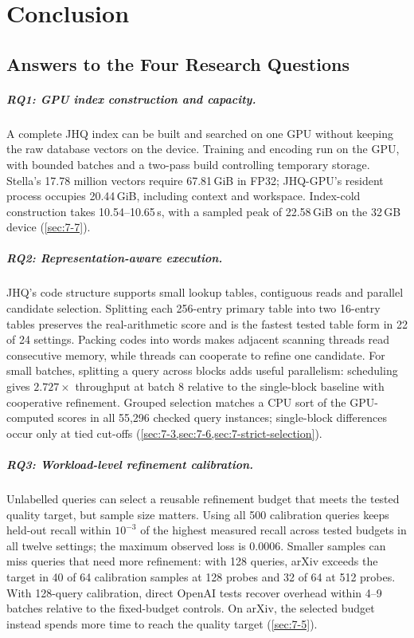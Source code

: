 \chapter{Conclusion}
\label{ch:conclusion}

\section{Answers to the Four Research Questions}
\label{sec:9-1}

\paragraph{RQ1: GPU index construction and capacity.}
A complete JHQ index can be built and searched on one GPU without keeping
the raw database vectors on the device. Training and encoding run on the
GPU, with bounded batches and a two-pass build controlling temporary
storage. Stella's 17.78 million vectors require 67.81\,GiB in FP32;
JHQ-GPU's resident process occupies 20.44\,GiB, including context and
workspace. Index-cold construction takes 10.54--10.65\,s, with a sampled peak of
22.58\,GiB on the 32\,GB device (\cref{sec:7-7}).

\paragraph{RQ2: Representation-aware execution.}
JHQ's code structure supports small lookup tables, contiguous reads and
parallel candidate selection. Splitting each 256-entry primary table
into two 16-entry tables preserves the real-arithmetic score and is the
fastest tested table form in 22 of 24 settings. Packing codes into words
makes adjacent scanning threads read consecutive memory, while threads
can cooperate to refine one candidate. For small batches, splitting a
query across blocks adds useful parallelism: scheduling gives
$2.727\times$ throughput at batch 8 relative to the single-block baseline
with cooperative refinement. Grouped selection matches a CPU sort of the
GPU-computed scores in all 55,296 checked query instances; single-block
differences occur only at tied cut-offs
(\cref{sec:7-3,sec:7-6,sec:7-strict-selection}).

\paragraph{RQ3: Workload-level refinement calibration.}
Unlabelled queries can select a reusable refinement budget that meets
the tested quality target, but sample size matters. Using all 500
calibration queries keeps held-out recall within $10^{-3}$ of the
highest measured recall across tested budgets in all twelve settings;
the maximum observed loss is 0.0006. Smaller samples can miss queries
that need more refinement: with 128 queries, arXiv exceeds the target
in 40 of 64 calibration samples at 128 probes and 32 of 64 at 512 probes. With 128-query calibration, direct OpenAI tests recover overhead
within 4--9 batches relative to the fixed-budget controls. On arXiv, the selected budget instead
spends more time to reach the quality target (\cref{sec:7-5}).

